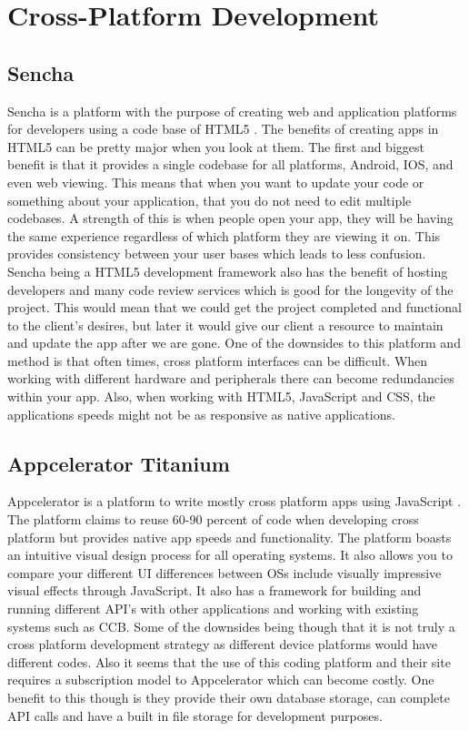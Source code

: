 \documentclass[letterpaper,10pt,draftclsnofoot,onecolumn,titlepage]{IEEEtran}
\begin{document}
	\section{Cross-Platform Development}
	\subsection{Sencha}
		Sencha is a platform with the purpose of creating web and application platforms for developers using a code base of HTML5 \cite{Sencha}. The benefits of creating apps in HTML5 can be pretty major when you look at them. The first and biggest benefit is that it provides a single codebase for all platforms, Android, IOS, and even web viewing. This means that when you want to update your code or something about your application, that you do not need to edit multiple codebases. A strength of this is when people open your app, they will be having the same experience regardless of which platform they are viewing it on. This provides consistency between your user bases which leads to less confusion. Sencha being a HTML5 development framework also has the benefit of hosting developers and many code review services which is good for the longevity of the project. This would mean that we could get the project completed and functional to the client’s desires, but later it would give our client a resource to maintain and update the app after we are gone. One of the downsides to this platform and method is that often times, cross platform interfaces can be difficult. When working with different hardware and peripherals there can become redundancies within your app. Also, when working with HTML5, JavaScript and CSS, the applications speeds might not be as responsive as native applications.
	\subsection{Appcelerator Titanium}
		Appcelerator is a platform to write mostly cross platform apps using JavaScript \cite{Appcelerator}. The platform claims to reuse 60-90 percent of code when developing cross platform but provides native app speeds and functionality. The platform boasts an intuitive visual design process for all operating systems. It also allows you to compare your different UI differences between OSs include visually impressive visual effects through JavaScript.  It also has a framework for building and running different API’s with other applications and working with existing systems such as CCB. Some of the downsides being though that it is not truly a cross platform development strategy as different device platforms would have different codes. Also it seems that the use of this coding platform and their site requires a subscription model to Appcelerator which can become costly. One benefit to this though is they provide their own database storage, can complete API calls and have a built in file storage for development purposes.
\end{document}
